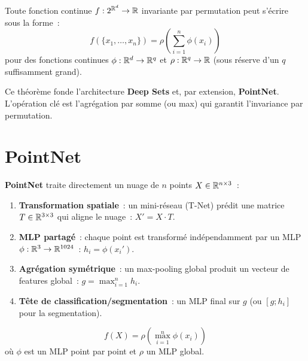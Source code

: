 \begin{theoreme}
\label{thm:deepsets}
Toute fonction continue $f : 2^{\mathbb{R}^d} \to \mathbb{R}$ invariante par
permutation peut s'\'ecrire sous la forme~:
\[
  f(\{x_1, \ldots, x_n\}) = \rho\!\left(
  \sum_{i=1}^n \phi(x_i)\right)
\]
pour des fonctions continues $\phi : \mathbb{R}^d \to \mathbb{R}^q$ et
$\rho : \mathbb{R}^q \to \mathbb{R}$ (sous r\'eserve d'un $q$ suffisamment grand).
\end{theoreme}

\begin{remarque}
Ce th\'eor\`eme fonde l'architecture \textbf{Deep Sets} et, par
extension, \textbf{PointNet}. L'op\'eration cl\'e est l'agr\'egation
par somme (ou max) qui garantit l'invariance par permutation.
\end{remarque}

\section{PointNet}
\label{sec:pointnet}

\begin{definition}
\textbf{PointNet} traite directement un nuage de $n$ points
$X \in \mathbb{R}^{n \times 3}$~:
\begin{enumerate}
  \item \textbf{Transformation spatiale}~: un mini-r\'eseau (T-Net)
        pr\'edit une matrice $T \in \mathbb{R}^{3 \times 3}$ qui aligne le nuage~:
        $X' = X \cdot T$.
  \item \textbf{MLP partag\'e}~: chaque point est transform\'e
        ind\'ependamment par un MLP $\phi : \mathbb{R}^3 \to \mathbb{R}^{1024}$~:
        $h_i = \phi(x_i')$.
  \item \textbf{Agr\'egation sym\'etrique}~: un max-pooling global
        produit un vecteur de features global~:
        $g = \max_{i=1}^n h_i$.
  \item \textbf{T\^ete de classification/segmentation}~: un MLP
        final sur $g$ (ou $[g; h_i]$ pour la segmentation).
\end{enumerate}
\end{definition}

\begin{formules}[title=\textbf{PointNet --- \'equation fondamentale}]
\[
  f(X) = \rho\!\left(\max_{i=1}^n \phi(x_i)\right)
\]
o\`u $\phi$ est un MLP point par point et $\rho$ un MLP global.
\end{formules}

